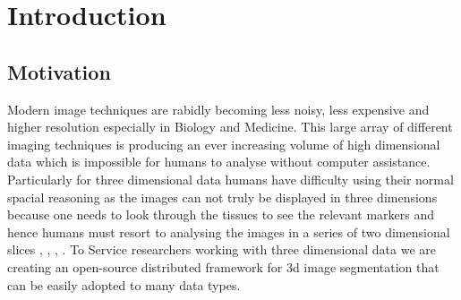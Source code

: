 \newcommand{\package}{\emph}

\chapter{Introduction}

\section{Motivation}

Modern image techniques are rabidly becoming less noisy, less expensive and higher resolution especially in Biology and Medicine. This large array of different imaging techniques is producing an ever increasing volume of high dimensional data which is impossible for humans to analyse without computer assistance. Particularly for three dimensional data humans have difficulty using their normal spacial reasoning as the images can not truly be displayed in three dimensions because one needs to look through the tissues to see the relevant markers and hence humans must resort to analysing the images in a series of two dimensional slices \cite{denk2004serial}, \cite{megason2007imaging}, \cite{keller2008reconstruction}, \cite{peng2011brainaligner}. To Service researchers working with three dimensional data we are creating an open-source distributed framework for 3d image segmentation that can be easily adopted to many data types. 

